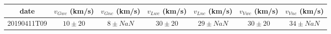 \begin{tabular}{ccccccc}
\toprule
       date & $v_{Gwc}$ (km/s) & $v_{Gnc}$ (km/s) & $v_{Lwc}$ (km/s) & $v_{Lnc}$ (km/s) & $v_{Vwc}$ (km/s) & $v_{Vnc}$ (km/s) \\
\midrule
20190411T09 &      $10 \pm 20$ &    $ 8 \pm NaN $ &      $30 \pm 20$ &   $ 29 \pm NaN $ &      $30 \pm 20$ &   $ 34 \pm NaN $ \\
\bottomrule
\end{tabular}
